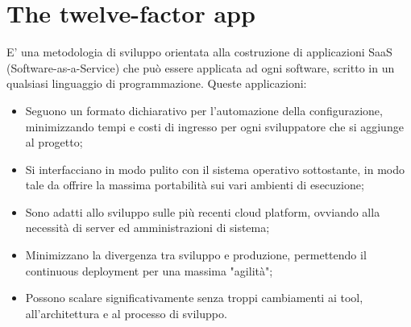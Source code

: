 \documentclass[PianoDiQualifica.tex]{subfiles}
\begin{document}
\chapter{The twelve-factor app}
E' una metodologia di sviluppo orientata alla costruzione di applicazioni SaaS (Software-as-a-Service) che può essere applicata ad ogni software, scritto in un qualsiasi linguaggio di programmazione.
Queste applicazioni:
\begin{itemize}
\item Seguono un formato dichiarativo per l'automazione della configurazione, minimizzando tempi e costi di ingresso per ogni sviluppatore che si aggiunge al progetto;
\item Si interfacciano in modo pulito con il sistema operativo sottostante, in modo tale da offrire la massima portabilità sui vari ambienti di esecuzione;
\item Sono adatti allo sviluppo sulle più recenti cloud platform, ovviando alla necessità di server ed amministrazioni di sistema;
\item Minimizzano la divergenza tra sviluppo e produzione, permettendo il continuous deployment per una massima "agilità";
\item Possono scalare significativamente senza troppi cambiamenti ai tool, all'architettura e al processo di sviluppo.
\end{itemize}
\end{document}
